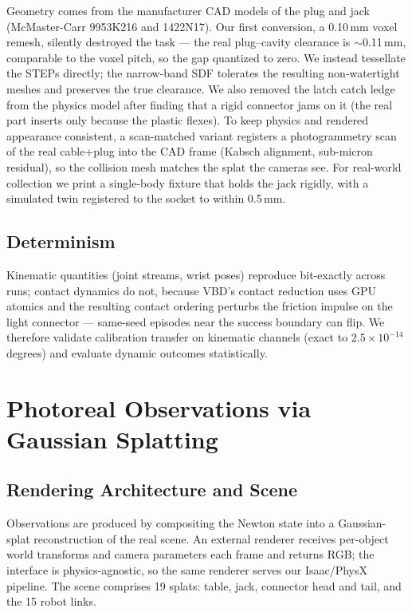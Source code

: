 Geometry comes from the manufacturer CAD models of the plug and jack
(McMaster-Carr 9953K216 and 1422N17). Our first conversion, a 0.10\,mm
voxel remesh, silently destroyed the task --- the real plug--cavity
clearance is $\sim$0.11\,mm, comparable to the voxel pitch, so the
gap quantized to zero. We instead tessellate the STEPs directly; the
narrow-band SDF tolerates the resulting non-watertight meshes and
preserves the true clearance. We also removed the latch catch ledge
from the physics model after finding that a rigid connector jams on
it (the real part inserts only because the plastic flexes). To keep
physics and rendered appearance consistent, a scan-matched variant
registers a photogrammetry scan of the real cable+plug into the CAD
frame (Kabsch alignment, sub-micron residual), so the collision mesh
matches the splat the cameras see. For real-world collection we
print a single-body fixture that holds the jack rigidly, with a
simulated twin registered to the socket to within 0.5\,mm.

\subsection{Determinism}

Kinematic quantities (joint streams, wrist poses) reproduce
bit-exactly across runs; contact dynamics do not, because VBD's
contact reduction uses GPU atomics and the resulting contact
ordering perturbs the friction impulse on the light connector ---
same-seed episodes near the success boundary can flip. We therefore
validate calibration transfer on kinematic channels (exact to
$2.5\times10^{-14}$ degrees) and evaluate dynamic outcomes
statistically.

\section{Photoreal Observations via Gaussian Splatting}

\subsection{Rendering Architecture and Scene}

Observations are produced by compositing the Newton state into a
Gaussian-splat reconstruction of the real scene. An external
renderer receives per-object world transforms and camera parameters
each frame and returns RGB; the interface is physics-agnostic, so
the same renderer serves our Isaac/PhysX pipeline. The scene comprises 19 splats: table, jack,
connector head and tail, and the 15 robot links.

